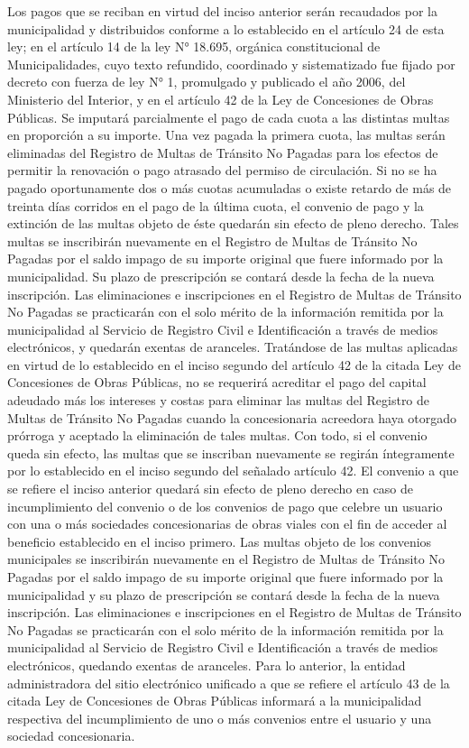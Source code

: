     Los pagos que se reciban en virtud del inciso anterior serán recaudados por la municipalidad y distribuidos conforme a lo establecido en el artículo 24 de esta ley; en el artículo 14 de la ley N° 18.695, orgánica constitucional de Municipalidades, cuyo texto refundido, coordinado y sistematizado fue fijado por decreto con fuerza de ley N° 1, promulgado y publicado el año 2006, del Ministerio del Interior, y en el artículo 42 de la Ley de Concesiones de Obras Públicas. Se imputará parcialmente el pago de cada cuota a las distintas multas en proporción a su importe.
    Una vez pagada la primera cuota, las multas serán eliminadas del Registro de Multas de Tránsito No Pagadas para los efectos de permitir la renovación o pago atrasado del permiso de circulación. Si no se ha pagado oportunamente dos o más cuotas acumuladas o existe retardo de más de treinta días corridos en el pago de la última cuota, el convenio de pago y la extinción de las multas objeto de éste quedarán sin efecto de pleno derecho. Tales multas se inscribirán nuevamente en el Registro de Multas de Tránsito No Pagadas por el saldo impago de su importe original que fuere informado por la municipalidad. Su plazo de prescripción se contará desde la fecha de la nueva inscripción. Las eliminaciones e inscripciones en el Registro de Multas de Tránsito No Pagadas se practicarán con el solo mérito de la información remitida por la municipalidad al Servicio de Registro Civil e Identificación a través de medios electrónicos, y quedarán exentas de aranceles. Tratándose de las multas aplicadas en virtud de lo establecido en el inciso segundo del artículo 42 de la citada Ley de Concesiones de Obras Públicas, no se requerirá acreditar el pago del capital adeudado más los intereses y costas para eliminar las multas del Registro de Multas de Tránsito No Pagadas cuando la concesionaria acreedora haya otorgado prórroga y aceptado la eliminación de tales multas. Con todo, si el convenio queda sin efecto, las multas que se inscriban nuevamente se regirán íntegramente por lo establecido en el inciso segundo del señalado artículo 42.
    El convenio a que se refiere el inciso anterior quedará sin efecto de pleno derecho en caso de incumplimiento del convenio o de los convenios de pago que celebre un usuario con una o más sociedades concesionarias de obras viales con el fin de acceder al beneficio establecido en el inciso primero. Las multas objeto de los convenios municipales se inscribirán nuevamente en el Registro de Multas de Tránsito No Pagadas por el saldo impago de su importe original que fuere informado por la municipalidad y su plazo de prescripción se contará desde la fecha de la nueva inscripción. Las eliminaciones e inscripciones en el Registro de Multas de Tránsito No Pagadas se practicarán con el solo mérito de la información remitida por la municipalidad al Servicio de Registro Civil e Identificación a través de medios electrónicos, quedando exentas de aranceles. Para lo anterior, la entidad administradora del sitio electrónico unificado a que se refiere el artículo 43 de la citada Ley de Concesiones de Obras Públicas informará a la municipalidad respectiva del incumplimiento de uno o más convenios entre el usuario y una sociedad concesionaria.
